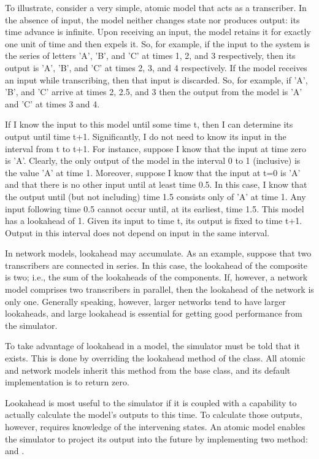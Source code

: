 To illustrate, consider a very simple, atomic model that acts as a transcriber. In the absence of input, the model neither changes state nor produces output: its time advance is infinite. Upon receiving an input, the model retains it for exactly one unit of time and then expels it. So, for example, if the input to the system is the series of letters 'A', 'B', and 'C' at times 1, 2, and 3 respectively, then its output is 'A', 'B', and 'C' at times 2, 3, and 4 respectively. If the model receives an input while transcribing, then that input is discarded. So, for example, if 'A', 'B', and 'C' arrive at times 2, 2.5, and 3 then the output from the model is 'A' and 'C' at times 3 and 4.

If I know the input to this model until some time t, then I can determine its output until time t+1. Significantly, I do not need to know its input in the interval from t to t+1. For instance, suppose I know that the input at time zero is 'A'. Clearly, the only output of the model in the interval 0 to 1 (inclusive) is the value 'A' at time 1. Moreover, suppose I know that the input at t=0 is 'A' and that there is no other input until at least time 0.5. In this case, I know that the output until (but not including) time 1.5 consists only of 'A' at time 1. Any input following time 0.5 cannot occur until, at its earliest, time 1.5. This model has a lookahead of 1. Given its input to time t, its output is fixed to time t+1. Output in this interval does not depend on input in the same interval.

In network models, lookahead may accumulate. As an example, suppose that two transcribers are connected in series. In this case, the lookahead of the composite is two; i.e., the sum of the lookaheads of the components. If, however, a network model comprises two transcribers in parallel, then the lookahead of the network is only one. Generally speaking, however, larger networks tend to have larger lookaheads, and large lookahead is essential for getting good performance from the simulator.

To take advantage of lookahead in a model, the simulator must be told that it exists. This is done by overriding the lookahead method of the  class. All atomic and network models inherit this method from the  base class, and its default implementation is to return zero. 

Lookahead is most useful to the simulator if it is coupled with a capability to actually calculate the model's outputs to this time. To calculate those outputs, however, requires knowledge of the intervening states. An atomic model enables the simulator to project its output into the future by implementing two method:  and .

